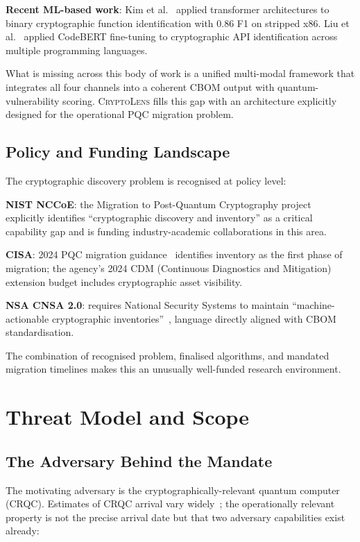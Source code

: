 \documentclass[sigconf,nonacm]{acmart}
\begin{document}
\textbf{Recent ML-based work}: Kim et al.~\cite{kim2024deepbin}
applied transformer architectures to binary cryptographic function
identification with 0.86 F1 on stripped x86. Liu et
al.~\cite{liu2025cryptoid} applied CodeBERT fine-tuning to
cryptographic API identification across multiple programming languages.

What is missing across this body of work is a unified multi-modal
framework that integrates all four channels into a coherent CBOM
output with quantum-vulnerability scoring. \textsc{CryptoLens} fills
this gap with an architecture explicitly designed for the operational
PQC migration problem.

\subsection{Policy and Funding Landscape}

The cryptographic discovery problem is recognised at policy level:

\textbf{NIST NCCoE}: the Migration to Post-Quantum Cryptography
project~\cite{nccoe2024cryptodisc} explicitly identifies
``cryptographic discovery and inventory'' as a critical capability
gap and is funding industry-academic collaborations in this area.

\textbf{CISA}: 2024 PQC migration guidance~\cite{cisa2024pqc}
identifies inventory as the first phase of migration; the agency's
2024 CDM (Continuous Diagnostics and Mitigation) extension
budget includes cryptographic asset visibility.

\textbf{NSA CNSA 2.0}: requires National Security Systems to
maintain ``machine-actionable cryptographic
inventories''~\cite{nsa2024cnsa2}, language directly aligned with
CBOM standardisation.

The combination of recognised problem, finalised algorithms, and
mandated migration timelines makes this an unusually well-funded
research environment.

\section{Threat Model and Scope}

\subsection{The Adversary Behind the Mandate}

The motivating adversary is the cryptographically-relevant quantum
computer (CRQC). Estimates of CRQC arrival vary
widely~\cite{mosca2024quantum,gidney2025quantumlogic}; the
operationally relevant property is not the precise arrival date but
that two adversary capabilities exist already:
\end{document}
